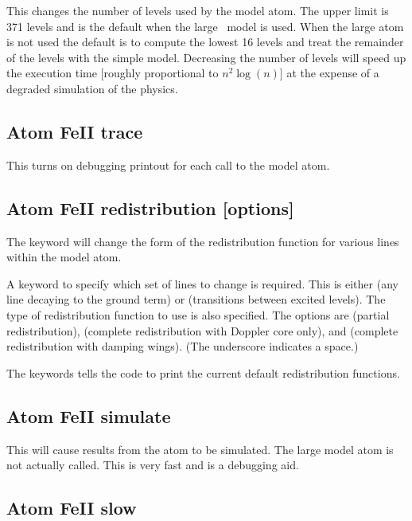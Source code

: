 This changes the number of levels used by the model atom.
The upper
limit is 371 levels and is the default when the large \feii\ model is used.
When the large atom is not used the default is to compute
the lowest 16
levels and treat the remainder of the levels with the \citet{Wills1985}
simple model.
Decreasing the number of levels will speed up the execution
time [roughly proportional to $n^2 \log(n)]$ at the expense of a degraded
simulation of the physics.

\subsection{Atom FeII trace}

This turns on debugging printout for each call to the model atom.

\subsection{Atom FeII redistribution [options]}

The keyword  will change
the form of the redistribution
function for various lines within the model atom.

A keyword to specify which set of lines to change is required.
This
is either  (any line decaying to the ground term)
or 
(transitions between excited levels).
The type of redistribution function
to use is also specified.
The options are  (partial redistribution),
 (complete redistribution with Doppler core only),
and  (complete
redistribution with damping wings).
(The underscore indicates a space.)

The keywords  tells the code to print
the current default redistribution functions.

\subsection{Atom FeII simulate}

This will cause results from the atom to be simulated.  The large model
atom is not actually called.  This is very fast and is a debugging aid.

\subsection{Atom FeII slow}

